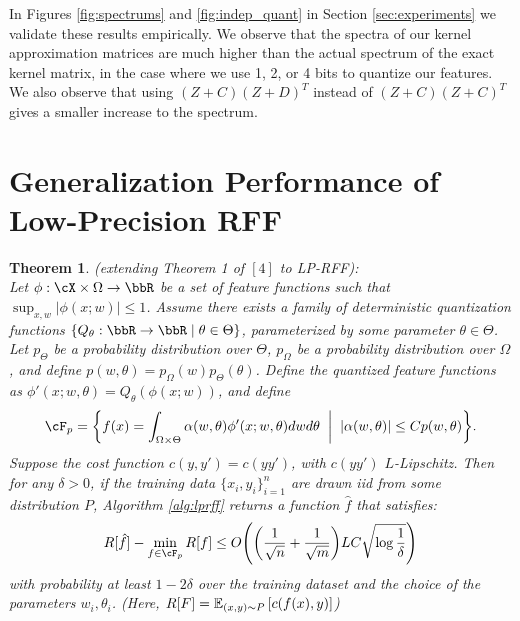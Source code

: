\documentclass[12pt]{article}
\newtheorem{theorem}{Theorem}[section]
\begin{document}
In Figures \ref{fig:spectrums} and \ref{fig:indep_quant} in Section \ref{sec:experiments} we validate these results empirically. We observe that the spectra of our kernel approximation matrices are much higher than the actual spectrum of the exact kernel matrix, in the case where we use 1, 2, or 4 bits to quantize our features.  We also observe that using $(Z+C)(Z+D)^T$ instead of $(Z+C)(Z+C)^T$ gives a smaller increase to the spectrum.

\section{Generalization Performance of Low-Precision RFF}
\label{sec:gen}

\begin{theorem} (extending Theorem 1 of $[4]$ to LP-RFF): \\
\label{thm:gen}
Let $\phi:\cX\times\Omega\rightarrow\RR$ be a set of feature functions such that $\sup_{x,w}|\phi(x;w)| \leq 1$. Assume there exists a family of deterministic quantization functions $\{Q_{\theta}:\RR\rightarrow\RR \;|\; \theta\in\Theta \}$, parameterized by some parameter $\theta\in\Theta$.  Let $p_{\Theta}$ be a probability distribution over $\Theta$, $p_{\Omega}$ be a probability distribution over $\Omega$, and define $p(w,\theta) = p_{\Omega}(w)p_{\Theta}(\theta)$.
Define the quantized feature functions as $\phi'(x;w,\theta) = Q_{\theta}(\phi(x;w))$, and define
$$\cF_p = \bigg\{f(x) = \int_{\Omega\times\Theta} \alpha(w,\theta) \phi'(x;w,\theta)dwd\theta \;\;\bigg|\;\; |\alpha(w,\theta)| \leq Cp(w,\theta)\bigg\}.$$
Suppose the cost function $c(y,y') = c(yy')$, with $c(yy')$ $L$-Lipschitz.  Then for any $\delta > 0$, if the training data $\{x_i,y_i\}_{i=1}^n$ are drawn iid from some distribution $P$, Algorithm \ref{alg:lprff}  returns a function $\hat{f}$ that satisfies:
$$R[\hat{f}] - \min_{f\in\cF_p}R[f] \leq O\Bigg(\bigg(\frac{1}{\sqrt{n}} + \frac{1}{\sqrt{m}}\bigg)LC \sqrt{\log\frac{1}{\delta}}\Bigg)$$
with probability at least $1-2\delta$ over the training dataset and the choice of the parameters $w_i,\theta_i$.
(Here, $R[F] = \expect{(x,y)\sim P}{c(f(x),y)}$)
\end{theorem}
\end{document}
